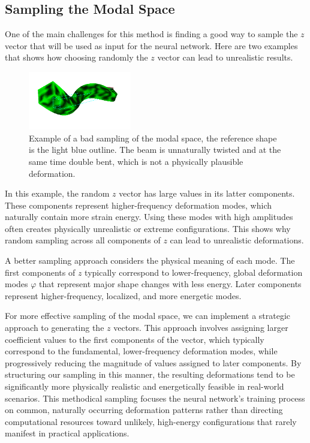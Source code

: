 \subsection{Sampling the Modal Space}
\label{sec:sampling_modal_space}
One of the main challenges for this method is finding a good way to sample the \(z\) vector that will be used as input for the neural network. Here are two examples that shows how choosing randomly the \(z\) vector can lead to unrealistic results. 
\begin{figure}[H]
    \centering
    \includegraphics[width=0.4\textwidth]{Images/z_random.png}
    \caption{Example of a bad sampling of the modal space, the reference shape is the light blue outline. The beam is unnaturally twisted and at the same time double bent, which is not a physically plausible deformation.}
    \label{fig:bad_sampling}
\end{figure}

In this example, the random \(z\) vector has large values in its latter components. These components represent higher-frequency deformation modes, which naturally contain more strain energy. Using these modes with high amplitudes often creates physically unrealistic or extreme configurations. This shows why random sampling across all components of \(z\) can lead to unrealistic deformations.

A better sampling approach considers the physical meaning of each mode. The first components of \(z\) typically correspond to lower-frequency, global deformation modes $\varphi$ that represent major shape changes with less energy. Later components represent higher-frequency, localized, and more energetic modes. 

For more effective sampling of the modal space, we can implement a strategic approach to generating the \(z\) vectors. This approach involves assigning larger coefficient values to the first components of the vector, which typically correspond to the fundamental, lower-frequency deformation modes, while progressively reducing the magnitude of values assigned to later components. By structuring our sampling in this manner, the resulting deformations tend to be significantly more physically realistic and energetically feasible in real-world scenarios. This methodical sampling focuses the neural network's training process on common, naturally occurring deformation patterns rather than directing computational resources toward unlikely, high-energy configurations that rarely manifest in practical applications.


